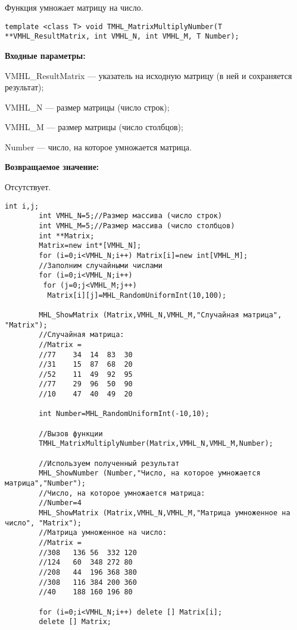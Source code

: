 \documentclass[a4paper,12pt]{article}
\begin{document}
Функция умножает матрицу на число.


\begin{lstlisting}[label=code_syntax_TMHL_MatrixMultiplyNumber,caption=Синтаксис]
template <class T> void TMHL_MatrixMultiplyNumber(T **VMHL_ResultMatrix, int VMHL_N, int VMHL_M, T Number);
\end{lstlisting}

\textbf{Входные параметры:}

 VMHL\_ResultMatrix --- указатель на исходную матрицу (в ней и сохраняется результат);
 
 VMHL\_N --- размер матрицы (число строк);
 
 VMHL\_M --- размер матрицы (число столбцов);
 
 Number --- число, на которое умножается матрица.

\textbf{Возвращаемое значение:}

Отсутствует.


\begin{lstlisting}[label=code_use_TMHL_MatrixMultiplyNumber,caption=Пример использования]
        int i,j;
        int VMHL_N=5;//Размер массива (число строк)
        int VMHL_M=5;//Размер массива (число столбцов)
        int **Matrix;
        Matrix=new int*[VMHL_N];
        for (i=0;i<VMHL_N;i++) Matrix[i]=new int[VMHL_M];
        //Заполним случайными числами
        for (i=0;i<VMHL_N;i++)
         for (j=0;j<VMHL_M;j++)
          Matrix[i][j]=MHL_RandomUniformInt(10,100);

        MHL_ShowMatrix (Matrix,VMHL_N,VMHL_M,"Случайная матрица", "Matrix");
        //Случайная матрица:
        //Matrix =
        //77	34	14	83	30
        //31	15	87	68	20
        //52	11	49	92	95
        //77	29	96	50	90
        //10	47	40	49	20

        int Number=MHL_RandomUniformInt(-10,10);

        //Вызов функции
        TMHL_MatrixMultiplyNumber(Matrix,VMHL_N,VMHL_M,Number);

        //Используем полученный результат
        MHL_ShowNumber (Number,"Число, на которое умножается матрица","Number");
        //Число, на которое умножается матрица:
        //Number=4
        MHL_ShowMatrix (Matrix,VMHL_N,VMHL_M,"Матрица умноженное на число", "Matrix");
        //Матрица умноженное на число:
        //Matrix =
        //308	136	56	332	120
        //124	60	348	272	80
        //208	44	196	368	380
        //308	116	384	200	360
        //40	188	160	196	80

        for (i=0;i<VMHL_N;i++) delete [] Matrix[i];
        delete [] Matrix;
\end{lstlisting}
\end{document}
